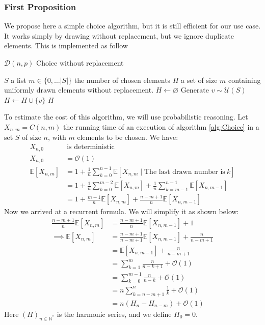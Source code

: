 \subsubsection{First Proposition}
We propose here a simple choice algorithm, but it is still efficient for our use case.
\newline It works simply by drawing without replacement, but we ignore duplicate elements. This is implemented as follow
\begin{algorithm}
	\caption{$\mathcal{D}(n,p)$ Choice without replacement}\label{alg:Choice}
	\begin{algorithmic}
		\Require $S$ a list
		\Require $m\in\{0,\dots \lvert S \rvert\}$ the number of chosen elements
		\Ensure $H$ a set of size $m$ containing uniformly drawn elements without replacement. 
		\State $H\leftarrow \varnothing$
			\State Generate $v\sim \mathcal{U}(S)$ 
			\State $H\leftarrow H \cup \{v\}$
		\EndWhile
		\State \Return $H$
	\end{algorithmic}
\end{algorithm}
\FloatBarrier
To estimate the cost of this algorithm, we will use probabilistic reasoning.
\newline Let $X_{n,m}=C(n,m)$ the running time of an execution of algorithm \ref{alg:Choice} in a set $S$ of size $n$, with $m$ elements to be chosen.
We have:
\begin{align*}
	X_{n,0} & \ \text{is deterministic}\\
	X_{n,0}&=\mathcal{O}(1) \\
	\mathbb{E}[X_{n,m}]&=1+\frac{1}{n}\sum_{k=0}^{n-1} \mathbb{E}[X_{n,m} \mid \text{The last drawn number is}\ k] \\
	&=1+\frac{1}{n}\sum_{k=0}^{m-2} \mathbb{E}[X_{n,m}]+\frac{1}{n}\sum_{k=m-1}^{n-1} \mathbb{E}[X_{n,m-1}] \\
	&= 1+\frac{m-1}{n}\mathbb{E}[X_{n,m}]+\frac{n-m+1}{n}\mathbb{E}[X_{n,m-1}]
\end{align*}
Now we arrived at a recurrent formula. We will simplify it as shown below:
\begin{align*}
\frac{n-m+1}{n}\mathbb{E}[X_{n,m}]&=\frac{n-m+1}{n}\mathbb{E}[X_{n,m-1}] +1\\
\implies \mathbb{E}[X_{n,m}]&=\frac{n-m+1}{n-m+1}\mathbb{E}[X_{n,m-1}]+\frac{n}{n-m+1}\\
&=\mathbb{E}[X_{n,m-1}]+\frac{n}{n-m+1} \\
&=\sum_{k=1}^m\frac{n}{n-k+1}+\mathcal{O}(1)\\
&=\sum_{k=0}^{m-1}\frac{n}{n-k}+\mathcal{O}(1) \\
&=n\sum_{k=n-m+1}^n\frac{1}{k}+\mathcal{O}(1)\\
&=n(H_n-H_{n-m})+\mathcal{O}(1)
\end{align*}
Here $(H)_{n\in\mathbb{N}^*}$ is the harmonic series, and we define $H_0=0.$
